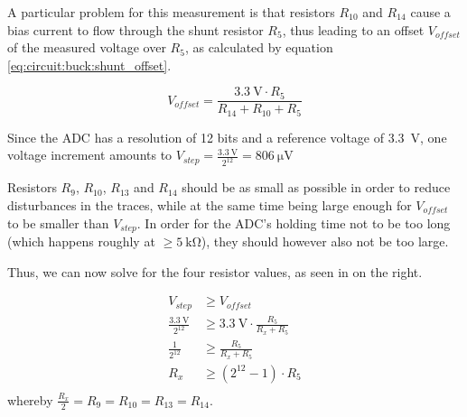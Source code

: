 \begin{minipage}{.50\textwidth}
A  particular problem  for this  measurement  is that  resistors $R_{10}$  and
$R_{14}$ cause a  bias current to flow through the  shunt resistor $R_5$, thus
leading  to an  offset $V_{offset}$  of the  measured voltage  over $R_5$,  as
calculated by equation \ref{eq:circuit:buck:shunt_offset}.
\end{minipage}
\begin{minipage}{.50\textwidth}
    \begin{equation}
        V_{offset} = \frac{ \SI{3.3}{\volt} \cdot R_5 }{ R_{14} + R_{10} + R_5 }
        \label{eq:circuit:buck:shunt_offset}
    \end{equation}
\end{minipage}

\begin{minipage}{.50\textwidth}
    Since  the  ADC  has  a  resolution   of  12  bits  and  a  reference  voltage
    of   \SI{3.3}{\volt},   one  voltage   increment   amounts   to  $V_{step}   =
    \frac{\SI{3.3}{\volt}}{2^{12}} = \SI{806}{\micro\volt}$

    Resistors $R_9$,  $R_{10}$, $R_{13}$  and $R_{14}$ should  be as  small as
    possible in order to reduce disturbances  in the traces, while at the same
    time being large enough for $V_{offset}$ to be smaller than $V_{step}$. In
    order for the ADC's holding time not to be too long (which happens roughly
    at $\geq \SI{5}{\kilo\ohm}$), they should however also not be too large.

    Thus, we can now  solve for the four resistor values,  as seen in on the right.
\end{minipage}
\begin{minipage}{.50\textwidth}


    \begin{align*}
                              V_{step} &\geq V_{offset} \\
        \frac{\SI{3.3}{\volt}}{2^{12}} &\geq \SI{3.3}{\volt} \cdot \frac{R_5}{R_x + R_5} \\
                      \frac{1}{2^{12}} &\geq \frac{R_5}{R_x + R_5} \\
                                   R_x &\geq \left( 2^{12} - 1 \right) \cdot R_5 \\
        \label{eq:solvethings}
    \end{align*}
    \hspace*{2em}whereby $\frac{R_x}{2} =  R_{9} = R_{10} = R_{13} =  R_{14}$.
\end{minipage}

